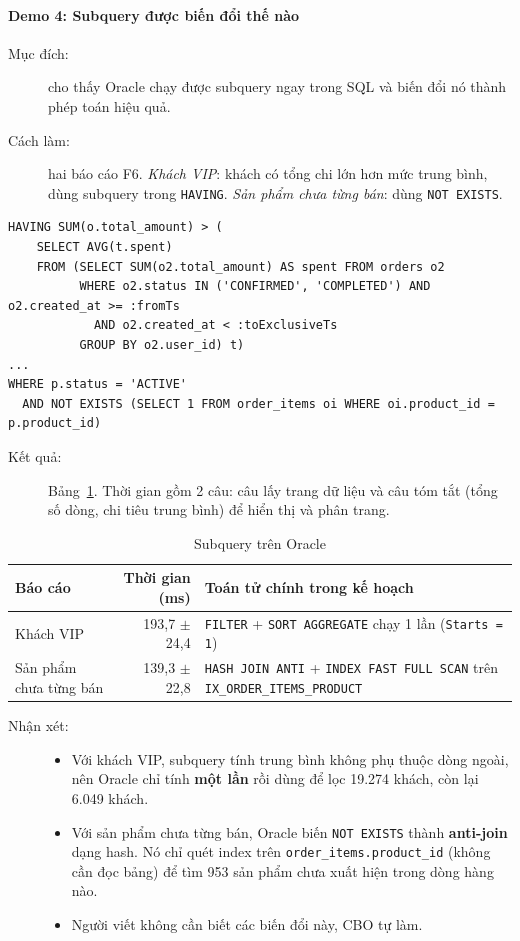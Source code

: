 \paragraph{Demo 4: Subquery được biến đổi thế nào}\label{sec:q-demo4}
\begin{description}
  \item[Mục đích:] cho thấy Oracle chạy được subquery ngay trong SQL và biến đổi nó thành phép toán hiệu quả.
  \item[Cách làm:] hai báo cáo F6. \textit{Khách VIP}: khách có tổng chi lớn hơn mức trung bình, dùng subquery trong \texttt{HAVING}. \textit{Sản phẩm chưa từng bán}: dùng \texttt{NOT EXISTS}.
\end{description}
\begin{Verbatim}[fontsize=\scriptsize,frame=single]
HAVING SUM(o.total_amount) > (
    SELECT AVG(t.spent)
    FROM (SELECT SUM(o2.total_amount) AS spent FROM orders o2
          WHERE o2.status IN ('CONFIRMED', 'COMPLETED') AND o2.created_at >= :fromTs
            AND o2.created_at < :toExclusiveTs
          GROUP BY o2.user_id) t)
...
WHERE p.status = 'ACTIVE'
  AND NOT EXISTS (SELECT 1 FROM order_items oi WHERE oi.product_id = p.product_id)
\end{Verbatim}
\begin{description}
  \item[Kết quả:] Bảng~\ref{tab:q-subquery}. Thời gian gồm 2 câu: câu lấy trang dữ liệu và câu tóm tắt (tổng số dòng, chi tiêu trung bình) để hiển thị và phân trang.
\end{description}

\begin{table}[H]
\centering
\caption{Subquery trên Oracle}\label{tab:q-subquery}
\small
\begin{tabularx}{\linewidth}{@{}lrX@{}}
\toprule
Báo cáo & Thời gian (ms) & Toán tử chính trong kế hoạch \\
\midrule
Khách VIP & 193,7 $\pm$ 24,4 & \texttt{FILTER} + \texttt{SORT AGGREGATE} chạy 1 lần (\texttt{Starts = 1}) \\
Sản phẩm chưa từng bán & 139,3 $\pm$ 22,8 & \texttt{HASH JOIN ANTI} + \texttt{INDEX FAST FULL SCAN} trên \texttt{IX\_ORDER\_ITEMS\_PRODUCT} \\
\bottomrule
\end{tabularx}
\end{table}

\begin{description}
  \item[Nhận xét:]\leavevmode
  \begin{itemize}
    \item Với khách VIP, subquery tính trung bình không phụ thuộc dòng ngoài, nên Oracle chỉ tính \textbf{một lần} rồi dùng để lọc 19.274 khách, còn lại 6.049 khách.
    \item Với sản phẩm chưa từng bán, Oracle biến \texttt{NOT EXISTS} thành \textbf{anti-join} dạng hash. Nó chỉ quét index trên \texttt{order\_items.product\_id} (không cần đọc bảng) để tìm 953 sản phẩm chưa xuất hiện trong dòng hàng nào.
    \item Người viết không cần biết các biến đổi này, CBO tự làm.
  \end{itemize}
\end{description}


